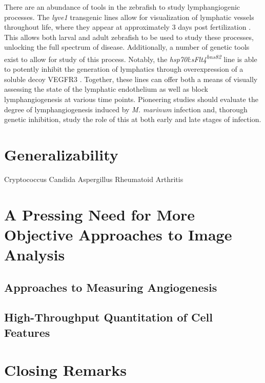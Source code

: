 There are an abundance of tools in the zebrafish to study lymphangiogenic processes. The \textit{lyve1} transgenic lines allow for visualization of lymphatic vessels throughout life, where they appear at approximately 3 days post fertilization \citep{Okuda2012}. This allows both larval and adult zebrafish to be used to study these processes, unlocking the full spectrum of disease. Additionally, a number of genetic tools exist to allow for study of this process. Notably, the \textit{hsp70l}:\textit{sFlt4\textsuperscript{bns82}} line is able to potently inhibit the generation of lymphatics through overexpression of a soluble decoy VEGFR3 \citep{Matsuoka2016}. Together, these lines can offer both a means of visually assessing the state of the lymphatic endothelium as well as block lymphangiogenesis at various time points. Pioneering studies should evaluate the degree of lymphangiogenesis induced by \textit{M. marinum} infection and, thorough genetic inhibition, study the role of this at both early and late stages of infection. 

\citep{Alitalo2005}
\citep{Bower2017a}
\citep{Bower2017b}
\citep{Bussmann2010}
\citep{Campuzano2017}
\citep{Dietrich2007}
\citep{Duong2012}
\citep{Hogan2009}
\citep{Wong2017b}
\citep{Makinen2001}
\citep{LeGuen2014}
\citep{Kuchler2006}
\citep{Haiko2008}
\citep{Stacker2014}
\citep{Nicenboim2015}
\citep{Onder2017}
\citep{Han2017}
\citep{Jung2017}
\citep{vanLessen2017}
\citep{Shin2017}

\section{Generalizability}

Cryptococcus
Candida
Aspergillus
Rheumatoid Arthritis

\citep{Bojarczuk2016, Lin2006b}

\section{A Pressing Need for More Objective Approaches to Image Analysis}

\subsection{Approaches to Measuring Angiogenesis}
\subsection{High-Throughput Quantitation of Cell Features}
\citep{Heath2017}


\section{Closing Remarks}
